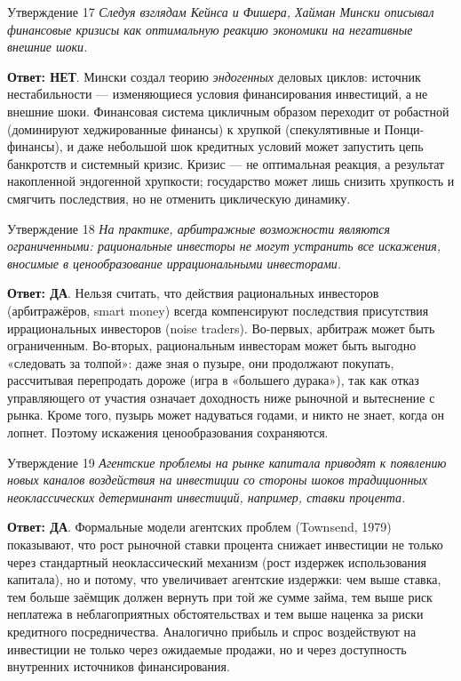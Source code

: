 \documentclass[10pt,a4paper]{article}
\newcommand{\qda}{\textbf{\color{yesgreen}Ответ: ДА}}
\newcommand{\qnet}{\textbf{\color{nored}Ответ: НЕТ}}
\newenvironment{answer}[2]{%
  \begin{qbox}{Утверждение #1}
  \textit{#2}\par\smallskip
}{%
  \end{qbox}\vspace{2pt}
}
\begin{document}
\begin{answer}{17}{Следуя взглядам Кейнса и Фишера, Хайман Мински описывал финансовые кризисы как оптимальную реакцию экономики на негативные внешние шоки.}
\qnet. Мински создал теорию \emph{эндогенных} деловых циклов: источник нестабильности --- изменяющиеся условия финансирования инвестиций, а не внешние шоки. Финансовая система цикличным образом переходит от робастной (доминируют хеджированные финансы) к хрупкой (спекулятивные и Понци-финансы), и даже небольшой шок кредитных условий может запустить цепь банкротств и системный кризис. Кризис --- не оптимальная реакция, а результат накопленной эндогенной хрупкости; государство может лишь снизить хрупкость и смягчить последствия, но не отменить циклическую динамику.
\end{answer}

\begin{answer}{18}{На практике, арбитражные возможности являются ограниченными: рациональные инвесторы не могут устранить все искажения, вносимые в ценообразование иррациональными инвесторами.}
\qda. Нельзя считать, что действия рациональных инвесторов (арбитражёров, smart money) всегда компенсируют последствия присутствия иррациональных инвесторов (noise traders). Во-первых, арбитраж может быть ограниченным. Во-вторых, рациональным инвесторам может быть выгодно «следовать за толпой»: даже зная о пузыре, они продолжают покупать, рассчитывая перепродать дороже (игра в «большего дурака»), так как отказ управляющего от участия означает доходность ниже рыночной и вытеснение с рынка. Кроме того, пузырь может надуваться годами, и никто не знает, когда он лопнет. Поэтому искажения ценообразования сохраняются.
\end{answer}

\begin{answer}{19}{Агентские проблемы на рынке капитала приводят к появлению новых каналов воздействия на инвестиции со стороны шоков традиционных неоклассических детерминант инвестиций, например, ставки процента.}
\qda. Формальные модели агентских проблем (Townsend, 1979) показывают, что рост рыночной ставки процента снижает инвестиции не только через стандартный неоклассический механизм (рост издержек использования капитала), но и потому, что увеличивает агентские издержки: чем выше ставка, тем больше заёмщик должен вернуть при той же сумме займа, тем выше риск неплатежа в неблагоприятных обстоятельствах и тем выше наценка за риски кредитного посредничества. Аналогично прибыль и спрос воздействуют на инвестиции не только через ожидаемые продажи, но и через доступность внутренних источников финансирования.
\end{answer}
\end{document}
